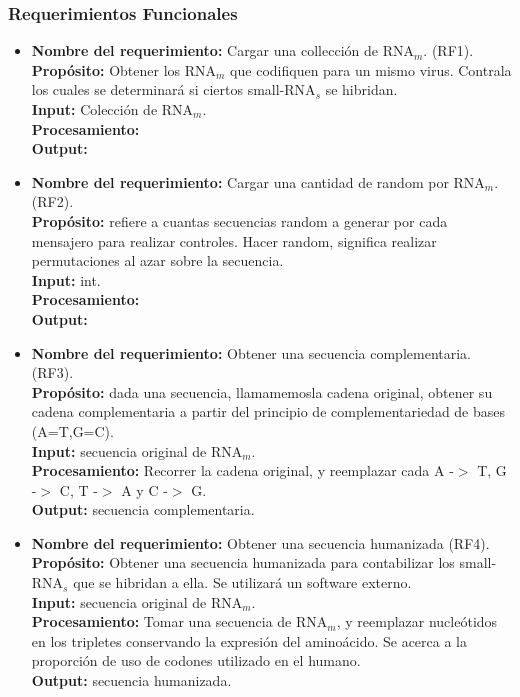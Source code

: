 \documentclass[12pt,a4paper,spanish]{article}
\begin{document}
	\subsubsection{Requerimientos Funcionales}
	\begin{itemize}
		\item \textbf{Nombre del requerimiento:} Cargar una collección de RNA$_m$. (RF1).\\
 	    \textbf{Propósito:} Obtener los RNA$_m$ que codifiquen para un mismo virus. Contrala los cuales se determinará si ciertos small-RNA$_s$ 								se hibridan.\\
		\textbf{Input:} Colección de RNA$_m$.\\
		\textbf{Procesamiento:} \\
		\textbf{Output:} \\

		\item \textbf{Nombre del requerimiento:} Cargar una cantidad de random por RNA$_m$. (RF2).\\
 	    \textbf{Propósito:} refiere a cuantas secuencias random a generar por cada mensajero para realizar controles. Hacer random, significa realizar 								permutaciones al azar sobre la secuencia. \\														
		\textbf{Input:} int.\\
		\textbf{Procesamiento:} \\
		\textbf{Output:} \\

		\item \textbf{Nombre del requerimiento:} Obtener una secuencia complementaria. (RF3).\\
		\textbf{Propósito:} dada una secuencia, llamamemosla cadena original, obtener su cadena complementaria a partir del principio de 								complementariedad de bases (A=T,G=C).\\
		\textbf{Input:} secuencia original de RNA$_m$.\\
		\textbf{Procesamiento:} Recorrer la cadena original, y reemplazar cada A -$>$ T, G -$>$ C, T -$>$ A y C -$>$ G.\\
		\textbf{Output:} secuencia complementaria.\\

		\item \textbf{Nombre del requerimiento:} Obtener una secuencia humanizada (RF4).\\
 	    \textbf{Propósito:} Obtener una secuencia humanizada para contabilizar los small-RNA$_s$ que se hibridan a ella. Se utilizará un software externo.\\
		\textbf{Input:} secuencia original de RNA$_m$.\\
		\textbf{Procesamiento:} Tomar una secuencia de RNA$_m$, y reemplazar nucleótidos en los tripletes conservando la expresión del aminoácido. Se 									acerca a la proporción de uso de codones utilizado en el humano. \\
		\textbf{Output:} secuencia humanizada.\\


\end{itemize}
\end{document}
